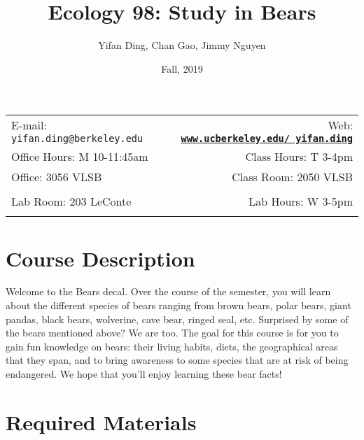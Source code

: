 \documentclass[11pt]{article}
\title{Ecology 98: Study in Bears}
\author{Yifan Ding, Chan Gao, Jimmy Nguyen}
\date{Fall, 2019}
\newcommand{\blankline}{\quad\pagebreak[2]}
\begin{document}
\maketitle

\blankline

\begin{tabular*}{.93\textwidth}{@{\extracolsep{\fill}}lr}


E-mail: \texttt{yifan.ding@berkeley.edu} & Web: \href{www.ucberkeley.edu/~yifan.ding}{\tt\bf www.ucberkeley.edu/~yifan.ding}  \\

 Office Hours: M 10-11:45am  &  Class Hours: T 3-4pm \\

 Office: 3056 VLSB & Class Room: 2050 VLSB \\
 & \\
Lab Room: 203 LeConte & Lab Hours: W 3-5pm \\
&  \\
\hline
\end{tabular*}

\vspace{5 mm}


\section*{Course Description}

Welcome to the Bears decal. Over the course of the semester, you will learn about the different species of bears ranging from brown bears, polar bears, giant pandas, black bears, wolverine, cave bear, ringed seal, etc. Surprised by some of the bears mentioned above? We are too. The goal for this course is for you to gain fun knowledge on bears: their living habits, diets, the geographical areas that they span, and to bring awareness to some species that are at risk of being endangered. We hope that you'll enjoy learning these bear facts! 


\section*{Required Materials}
\end{document}

